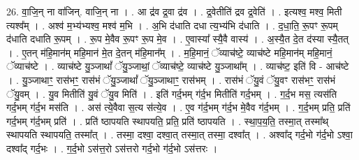 \documentclass[17pt]{extarticle}
\begin{document}
26. वा॒जि॒न् ना वा॑जिन्. वाजि॒न् ना । . आ द्र॑व द्र॒वा द्र॑व । . द्र॒वेतीति॑ द्रव द्र॒वेति॑ । . इत्यश्व॒ मश्व॒ मिती त्यश्व᳚म् । . अश्व॑ म॒भ्य॑भ्यश्व॒ मश्व॑ म॒भि । . अ॒भि द॑धाति दधा त्य॒भ्य॑भि द॑धाति । . द॒धा॒ति॒ रू॒पꣳ रू॒पम् द॑धाति दधाति रू॒पम् । . रू॒प मे॒वैव रू॒पꣳ रू॒प मे॒व । . ए॒वास्या᳚ स्यै॒वै वास्य॑ । . अ॒स्यै॒त दे॒त द॑स्या स्यै॒तत् । . ए॒तन् म॑हि॒मान॑म् महि॒मान॑ मे॒त दे॒तन् म॑हि॒मान᳚म् । . म॒हि॒मानं॒ ॅव्याच॑ष्टे॒ व्याच॑ष्टे महि॒मान॑म् महि॒मानं॒ ॅव्याच॑ष्टे । . व्याच॑ष्टे यु॒ञ्जाथां᳚ ॅयु॒ञ्जाथां॒ ॅव्याच॑ष्टे॒ व्याच॑ष्टे यु॒ञ्जाथा᳚म् । . व्याच॑ष्ट॒ इति॑ वि - आच॑ष्टे । . यु॒ञ्जाथाꣳ॒॒ रास॑भꣳ॒॒ रास॑भं ॅयु॒ञ्जाथां᳚ ॅयु॒ञ्जाथाꣳ॒॒ रास॑भम् । . रास॑भं ॅयु॒वं ॅयु॒वꣳ रास॑भꣳ॒॒ रास॑भं ॅयु॒वम् । . यु॒व मितीति॑ यु॒वं ॅयु॒व मिति॑ । . इति॑ गर्द॒भम् ग॑र्द॒भ मितीति॑ गर्द॒भम् । . ग॒र्द॒भ मस॒ त्यस॑ति गर्द॒भम् ग॑र्द॒भ मस॑ति । . अस॑ त्ये॒वैवा स॒त्य स॑त्ये॒व । . ए॒व ग॑र्द॒भम् ग॑र्द॒भ मे॒वैव ग॑र्द॒भम् । . ग॒र्द॒भम् प्रति॒ प्रति॑ गर्द॒भम् ग॑र्द॒भम् प्रति॑ । . प्रति॑ ष्ठापयति स्थापयति॒ प्रति॒ प्रति॑ ष्ठापयति । . स्था॒प॒य॒ति॒ तस्मा॒त् तस्मा᳚थ् स्थापयति स्थापयति॒ तस्मा᳚त् । . तस्मा॒ दश्वा॒ दश्वा॒त् तस्मा॒त् तस्मा॒ दश्वा᳚त् । . अश्वा᳚द् गर्द॒भो ग॑र्द॒भो ऽश्वा॒ दश्वा᳚द् गर्द॒भः । . ग॒र्द॒भो ऽस॑त्त॒रो ऽस॑त्तरो गर्द॒भो ग॑र्द॒भो ऽस॑त्तरः । \newline
\end{document}
